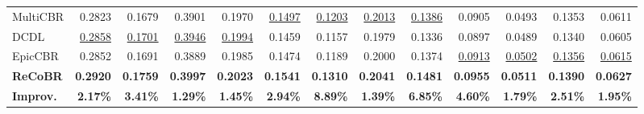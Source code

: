 \documentclass[letterpaper,journal]{IEEEtran}
\begin{document}
\begin{table}[!t]
{\begin{tabular}{@{}lrrrrrrrrrrrr@{}}
        MultiCBR
        & 0.2823 & 0.1679 & 0.3901 & 0.1970
        & \underline{0.1497} & \underline{0.1203} & \underline{0.2013} & \underline{0.1386}
        & 0.0905 & 0.0493 & 0.1353 & 0.0611 \\

        DCDL
        & \underline{0.2858} & \underline{0.1701} & \underline{0.3946} & \underline{0.1994}
        & 0.1459 & 0.1157 & 0.1979 & 0.1336
        & 0.0897 & 0.0489 & 0.1340 & 0.0605 \\

        EpicCBR
        & 0.2852 & 0.1691 & 0.3889 & 0.1985
        & 0.1474 & 0.1189 & 0.2000 & 0.1374
        & \underline{0.0913} & \underline{0.0502} & \underline{0.1356} & \underline{0.0615} \\

        \midrule
        \textbf{ReCoBR}
        & \textbf{0.2920} & \textbf{0.1759} & \textbf{0.3997} & \textbf{0.2023}
        & \textbf{0.1541} & \textbf{0.1310} & \textbf{0.2041} & \textbf{0.1481}
        & \textbf{0.0955} & \textbf{0.0511} & \textbf{0.1390} & \textbf{0.0627} \\

        \midrule
        \textbf{Improv.}
        & \textbf{2.17\%} & \textbf{3.41\%} & \textbf{1.29\%} & \textbf{1.45\%}
        & \textbf{2.94\%} & \textbf{8.89\%} & \textbf{1.39\%} & \textbf{6.85\%}
        & \textbf{4.60\%} & \textbf{1.79\%} & \textbf{2.51\%} & \textbf{1.95\%} \\
        \bottomrule
    \end{tabular}
    }
\end{table}
\end{document}
